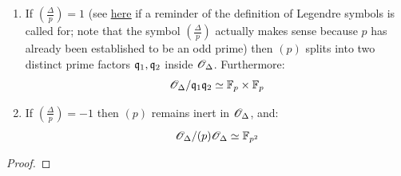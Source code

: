 \begin{corollary}
\begin{enumerate}
\begin{enumerate}
                                \item If $\left(\frac{\Delta}{p}\right) = 1$ (see \href{https://ncatlab.org/nlab/show/quadratic+reciprocity+law}{\underline{here}} if a reminder of the definition of Legendre symbols is called for; note that the symbol $\left(\frac{\Delta}{p}\right)$ actually makes sense because $p$ has already been established to be an odd prime) then $(p)$ splits into two distinct prime factors $\mathfrak{q}_1, \mathfrak{q}_2$ inside $\mathscr{O}_{\Delta}$. Furthermore:
                                    $$\scrO_{\Delta}/\q_1\q_2 \cong \F_p \x \F_p$$
                                \item If $\left(\frac{\Delta}{p}\right) = -1$ then $(p)$ remains inert in $\mathscr{O}_{\Delta}$, and:
                                    $$\mathscr{O}_{\Delta}/(p)\mathscr{O}_{\Delta} \simeq \mathbb{F}_{p^2}$$
                            \end{enumerate}
                    \end{enumerate}
            \end{corollary}
                \begin{proof}
                    
                \end{proof}
                
